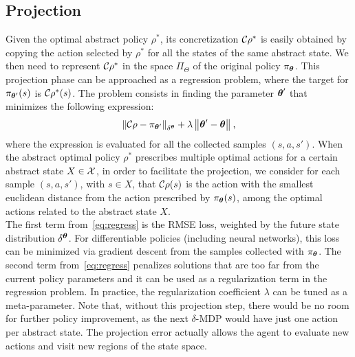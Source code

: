 \subsection{Projection} \label{subsec:proj}
Given the optimal abstract policy $\rho^*$, its concretization $\Conc\rho^*$ is easily obtained by copying the action selected by $\rho^{*}$ for all the states of the same abstract state. We then need to represent $\Conc\rho^{*}$ in the space $\Pi_{\Theta}$ of the original policy $\pi_{\vtheta}$. This projection phase can be approached as a regression problem, where the target for $\pi_{\vtheta'}(s)$ is $\Conc\rho^*(s)$. The problem consists in finding the parameter $\vtheta'$ that minimizes the following expression:
\begin{align}\label{eq:regress}
\norm[\delta^{\vtheta}]{\Conc\rho - \pi_{\vtheta'}} 
+ \lambda\norm{\vtheta'-\vtheta},
\end{align} 
where the expression is evaluated for all the collected samples $(s,a,s')$. 
When the abstract optimal policy $\rho^{*}$ prescribes multiple optimal actions for a certain abstract state $X \in \Xspace$, in order to facilitate the projection, we consider for each sample $(s,a,s')$, with $s \in X$, that $\Conc\rho(s)$ is the action with the smallest euclidean distance from the action prescribed by $\pi_{\vtheta}(s)$, among the optimal actions related to the abstract state $X$.\\
\newline
The first term from~\eqref{eq:regress} is the \acf{RMSE} loss, weighted by the future state distribution $\delta^{\vtheta}$. For differentiable policies (including neural networks), this loss can be minimized via gradient descent from the samples collected with $\pi_{\vtheta}$. The second term from~\eqref{eq:regress} penalizes solutions that are too far from the current policy parameters and it can be used as a regularization term in the regression problem. In practice, the regularization coefficient $\lambda$ can be tuned as a meta-parameter. Note that, without this projection step, there would be no room for further policy improvement, as the next $\delta$-\ac{MDP} would have just one action per abstract state. The projection error actually allows the agent to evaluate new actions and visit new regions of the state space. 

